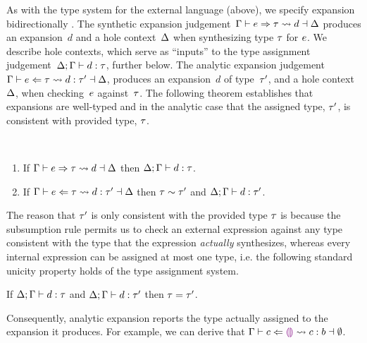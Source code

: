 As with the type system for the external language (above),
we specify expansion bidirectionally \cite{DBLP:conf/ppdp/FerreiraP14}.
%
The synthetic expansion judgement~$\Gamma \vdash e \Rightarrow \tau \leadsto d \dashv \Delta$
%
produces an expansion~$d$ and a hole context~$\Delta$ when synthesizing type $\tau$ for $e$.
%
We describe hole contexts, which serve as ``inputs'' to the type assignment judgement~$\Delta; \Gamma \vdash d : \tau$, further below.
%
The analytic expansion judgement~$\Gamma \vdash e \Leftarrow \tau \leadsto d : \tau' \dashv \Delta$, produces an expansion~$d$ of type~$\tau'$, and a hole context~$\Delta$, when checking~$e$ against~$\tau$.
%
The following theorem establishes that expansions are well-typed and in the analytic case that the assigned type, $\tau'$, is consistent with provided type, $\tau$.
%
\begin{thm}\label{thm:typed-expansion} ~
  \begin{enumerate}[nolistsep]
    \item
      If $\Gamma \vdash e \Rightarrow \tau \leadsto d \dashv \Delta$
      then $\Delta; \Gamma \vdash d : \tau$.
    \item
      If $\Gamma \vdash e \Leftarrow \tau \leadsto d : \tau' \dashv \Delta$
      then $\tau \sim \tau'$ and $\Delta; \Gamma \vdash d : \tau'$.
  \end{enumerate}
\end{thm}
\noindent
%
%
The reason that $\tau'$ is only consistent with the provided type $\tau$ is because
%
 the subsumption rule permits us
to check an external expression against any type consistent with the
type that the expression \emph{actually} synthesizes, whereas every internal
expression can be assigned at most one type, i.e. the following
standard unicity property holds of the type assignment system.
%
\begin{thm}
  If $\Delta; \Gamma \vdash d : \tau$
  and $\Delta; \Gamma \vdash d : \tau'$
  then $\tau=\tau'$.
\end{thm}
\noindent
Consequently, analytic expansion reports the type actually assigned to the expansion it produces.
%
For example, we can derive that $\Gamma \vdash c \Leftarrow \textcolor{violet}{\llparenthesis}\textcolor{violet}{\rrparenthesis} \leadsto c : b \dashv \emptyset$.%

